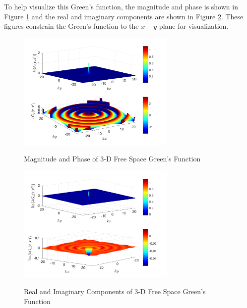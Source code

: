 To help visualize this Green's function, the magnitude and phase is shown in Figure \ref{gf_fig:1} and the real and imaginary components are shown in Figure \ref{gf_fig:2}. These figures constrain the Green's function to the $x-y$ plane for visualization.

\begin{figure}[H]
\begin{center}
\includegraphics[width=3in]{../media/3d_fs_gf_mag.png}
\end{center}
\renewcommand{\baselinestretch}{1}
\small\normalsize
\begin{quote}
\caption[Magnitude and Phase of 3-D Free Space Green's Function]{ Magnitude and Phase of 3-D Free Space Green's Function\label{gf_fig:1}}
\end{quote}
\end{figure} 
\renewcommand{\baselinestretch}{2}
\small\normalsize

\begin{figure}[H]
\begin{center}
\includegraphics[width=3in]{../media/3d_fs_gf_re_im.png}
\end{center}
\renewcommand{\baselinestretch}{1}
\small\normalsize
\begin{quote}
\caption[Real and Imaginary Components of 3-D Free Space Green's Function]{Real and Imaginary Components of 3-D Free Space Green's Function \label{gf_fig:2}}
\end{quote}
\end{figure} 
\renewcommand{\baselinestretch}{2}
\small\normalsize

